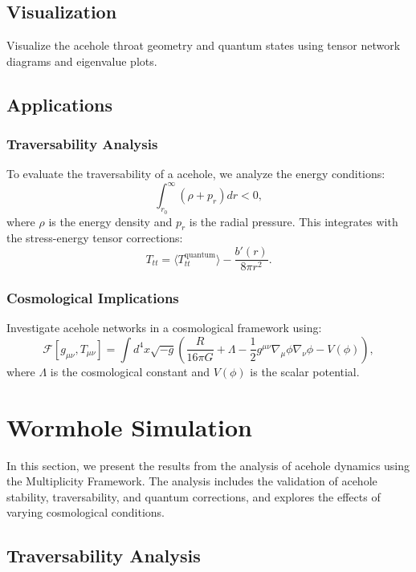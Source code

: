 \documentclass{article}
\theoremstyle{plain}
\begin{document}
\begin{itemize}
\begin{itemize}
\subsection{Visualization}
Visualize the acehole throat geometry and quantum states using tensor network diagrams and eigenvalue plots.

\subsection{Applications}

\subsubsection{Traversability Analysis}
To evaluate the traversability of a acehole, we analyze the energy conditions:
\begin{equation}
    \int_{r_0}^\infty \left(\rho + p_r\right) dr < 0,
\end{equation}
where $\rho$ is the energy density and $p_r$ is the radial pressure. This integrates with the stress-energy tensor corrections:
\begin{equation}
    T_{tt} = \langle T_{tt}^{\text{quantum}} \rangle - \frac{b'(r)}{8\pi r^2}.
\end{equation}

\subsubsection{Cosmological Implications}
Investigate acehole networks in a cosmological framework using:
\begin{equation}
    \mathcal{F}[g_{\mu\nu}, T_{\mu\nu}] = \int d^4x \sqrt{-g} \left( \frac{R}{16\pi G} + \Lambda - \frac{1}{2}g^{\mu\nu}\nabla_\mu \phi \nabla_\nu \phi - V(\phi) \right),
\end{equation}
where $\Lambda$ is the cosmological constant and $V(\phi)$ is the scalar potential.

\section{Wormhole Simulation}

In this section, we present the results from the analysis of acehole dynamics using the Multiplicity Framework. The analysis includes the validation of acehole stability, traversability, and quantum corrections, and explores the effects of varying cosmological conditions.

\subsection{Traversability Analysis}


\end{itemize}
\end{itemize}
\end{document}
